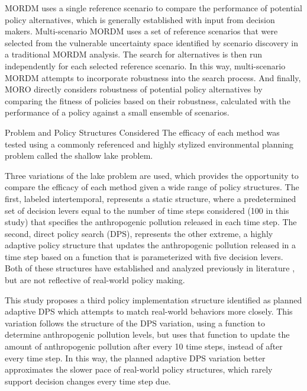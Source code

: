 MORDM uses a single reference scenario to compare the performance of potential policy alternatives, which is generally established with input from decision makers. Multi-scenario MORDM uses a set of reference scenarios that were selected from the vulnerable uncertainty space identified by scenario discovery in a traditional MORDM analysis. The search for alternatives is then run independently for each selected reference scenario. In this way, multi-scenario MORDM attempts to incorporate robustness into the search process. And finally, MORO directly considers robustness of potential policy alternatives by comparing the fitness of policies based on their robustness, calculated with the performance of a policy against a small ensemble of scenarios. 

\vspace{\baselineskip}
{\Large {\color{title}Problem and Policy Structures Considered}}
\vspace{0.5\baselineskip} \newline
The efficacy of each method was tested using a commonly referenced and highly stylized environmental planning problem called the shallow lake problem. 

Three variations of the lake problem are used, which provides the opportunity to compare the efficacy of each method given a wide range of policy structures. The first, labeled intertemporal, represents a static structure, where a predetermined set of decision levers equal to the number of time steps considered (100 in this study) that specifies the anthropogenic pollution released in each time step. The second, direct policy search (DPS), represents the other extreme, a highly adaptive policy structure that updates the anthropogenic pollution released in a time step based on a function that is parameterized with five decision levers. Both of these structures have established and analyzed previously in literature \citep{Quinn2017,Singh2015,Ward2015}, but are not reflective of real-world policy making. 

This study proposes a third policy implementation structure identified as planned adaptive DPS which attempts to match real-world behaviors more closely. This variation follows the structure of the DPS variation, using a function to determine anthropogenic pollution levels, but uses that function to update the amount of anthropogenic pollution after every 10 time steps, instead of after every time step. In this way, the planned adaptive DPS variation better approximates the slower pace of real-world policy structures, which rarely support decision changes every time step due. 

